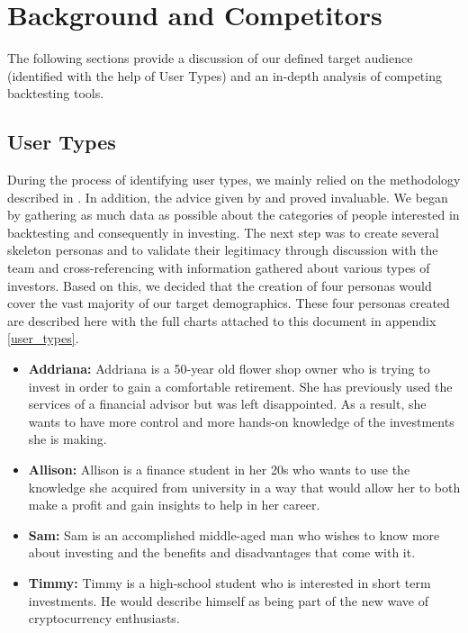 \documentclass[main.tex]{subfiles}
\begin{document}
\section{Background and Competitors}

The following sections provide a discussion of our defined target audience (identified with the help of User Types) and an in-depth analysis of competing backtesting tools.

\subsection{User Types}

During the process of identifying user types, we mainly relied on the methodology described in \cite{pathy}. In addition, the advice given by \cite{uiux_fundation} and \cite{user_types_interaction_design_fundation} proved invaluable. We began by gathering as much data as possible about the categories of people interested in backtesting and consequently in investing. The next step was to create several skeleton personas \cite{personas} and to validate their legitimacy through discussion with the team and cross-referencing with information gathered about various types of investors. Based on this, we decided that the creation of four personas would cover the vast majority of our target demographics.
These four personas created are described here with the full charts attached to this document in appendix \ref{user_types}.
\begin{itemize}
\item \textbf{Addriana: }Addriana is a 50-year old flower shop owner who is trying to invest in order to gain a comfortable retirement. She has previously used the services of a financial advisor but was left disappointed. As a result, she wants to have more control and more hands-on knowledge of the investments she is making.
\item \textbf{Allison: }Allison is a finance student in her 20s who wants to use the knowledge she acquired from university in a way that would allow her to both make a profit and gain insights to help in her career.
\item\textbf{Sam: }Sam is an accomplished middle-aged man who wishes to know more about investing and the benefits and disadvantages that come with it. 
\item\textbf{Timmy: }Timmy is a high-school student who is interested in short term investments. He would describe himself as being part of the new wave of cryptocurrency enthusiasts.
\end{itemize}
\end{document}
